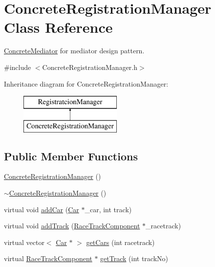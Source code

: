 \hypertarget{class_concrete_registration_manager}{}\section{Concrete\+Registration\+Manager Class Reference}
\label{class_concrete_registration_manager}


\mbox{\hyperlink{class_concrete_mediator}{Concrete\+Mediator}} for mediator design pattern.  




{\ttfamily \#include $<$Concrete\+Registration\+Manager.\+h$>$}

Inheritance diagram for Concrete\+Registration\+Manager\+:\begin{figure}[H]
\begin{center}
\leavevmode
\includegraphics[height=2.000000cm]{class_concrete_registration_manager}
\end{center}
\end{figure}
\subsection*{Public Member Functions}
\begin{DoxyCompactItemize}
\item 
\mbox{\hyperlink{class_concrete_registration_manager_a14de4a7f39a166d72e179549d99ddb9b}{Concrete\+Registration\+Manager}} ()
\item 
\mbox{\hyperlink{class_concrete_registration_manager_af27dd222a03c0d4c0dda6eea53b195e0}{$\sim$\+Concrete\+Registration\+Manager}} ()
\item 
virtual void \mbox{\hyperlink{class_concrete_registration_manager_a852824cb63b25c30dd4f626d5097c748}{add\+Car}} (\mbox{\hyperlink{class_car}{Car}} $\ast$\+\_\+car, int track)
\item 
virtual void \mbox{\hyperlink{class_concrete_registration_manager_ab7b6cd458f9ff3c5ff7b9413dff48e6a}{add\+Track}} (\mbox{\hyperlink{class_race_track_component}{Race\+Track\+Component}} $\ast$\+\_\+racetrack)
\item 
virtual vector$<$ \mbox{\hyperlink{class_car}{Car}} $\ast$ $>$ \mbox{\hyperlink{class_concrete_registration_manager_acea73f6efa6ec01052d3d43694405e66}{get\+Cars}} (int racetrack)
\item 
virtual \mbox{\hyperlink{class_race_track_component}{Race\+Track\+Component}} $\ast$ \mbox{\hyperlink{class_concrete_registration_manager_a0a6cb4186150d569ac883c66860a52ef}{get\+Track}} (int track\+No)
\end{DoxyCompactItemize}


